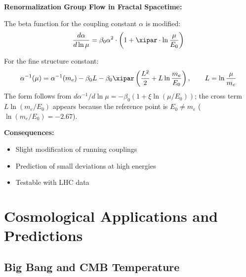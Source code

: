 	\begin{relation}
		\textbf{Renormalization Group Flow in Fractal Spacetime:}
		
		The beta function for the coupling constant $\alpha$ is modified:
		\begin{equation}
			\frac{d\alpha}{d\ln\mu} = \beta_0 \alpha^2 \cdot \left(1 + \xipar \cdot \ln\frac{\mu}{E_0}\right)
		\end{equation}
		
		For the fine structure constant:
		\begin{equation}
			\alpha^{-1}(\mu) = \alpha^{-1}(m_e) - \beta_0 L - \beta_0 \xipar \left(\frac{L^2}{2} + L \ln\frac{m_e}{E_0}\right), \qquad L = \ln\frac{\mu}{m_e}
		\end{equation}
		The form follows from $d\alpha^{-1}/d\ln\mu = -\beta_0(1+\xi\ln(\mu/E_0))$; the cross term $L\ln(m_e/E_0)$ appears because the reference point is $E_0 \neq m_e$ ($\ln(m_e/E_0) = -2.67$).
		
		\textbf{Consequences:}
		\begin{itemize}
			\item Slight modification of running couplings
			\item Prediction of small deviations at high energies
			\item Testable with LHC data
		\end{itemize}
	\end{relation}
	
	\section{Cosmological Applications and Predictions}
	
	\subsection{Big Bang and CMB Temperature}
	
